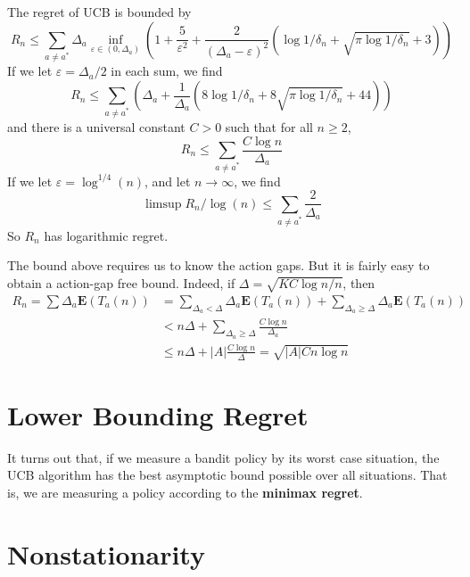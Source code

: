 \begin{theorem}
    The regret of UCB is bounded by
    \[ R_n \leq \sum_{a \neq a^*} \Delta_a \inf_{\varepsilon \in (0,\Delta_a)} \left(1 + \frac{5}{\varepsilon^2} + \frac{2}{(\Delta_a - \varepsilon)^2} \left(\log 1/\delta_n + \sqrt{\pi \log 1/\delta_n} + 3\right) \right) \]
    If we let $\varepsilon = \Delta_a/2$ in each sum, we find
    \[ R_n \leq \sum_{a \neq a^*} \left( \Delta_a + \frac{1}{\Delta_a} \left( 8 \log 1/\delta_n + 8 \sqrt{\pi \log 1 / \delta_n} + 44 \right) \right) \]
    and there is a universal constant $C > 0$ such that for all $n \geq 2$,
    \[ R_n \leq \sum_{a \neq a^*} \frac{C \log n}{\Delta_a} \]
    If we let $\varepsilon = \log^{1/4}(n)$, and let $n \to \infty$, we find
    \[ \limsup R_n/\log(n) \leq \sum_{a \neq a^*} \frac{2}{\Delta_a} \]
    So $R_n$ has logarithmic regret.
\end{theorem}

The bound above requires us to know the action gaps. But it is fairly easy to obtain a action-gap free bound. Indeed, if $\Delta = \sqrt{KC \log n / n}$, then
%
\begin{align*}
    R_n = \sum \Delta_a \mathbf{E}(T_a(n)) &= \sum_{\Delta_a < \Delta} \Delta_a \mathbf{E}(T_a(n)) + \sum_{\Delta_a \geq \Delta} \Delta_a \mathbf{E}(T_a(n))\\
    &< n \Delta + \sum_{\Delta_a \geq \Delta} \frac{C \log n}{\Delta_a}\\
    &\leq n \Delta + |A| \frac{C \log n}{\Delta} = \sqrt{|A| C n \log n}
\end{align*}

\section{Lower Bounding Regret}

It turns out that, if we measure a bandit policy by its worst case situation, the UCB algorithm has the best asymptotic bound possible over all situations. That is, we are measuring a policy according to the {\bf minimax regret}.

\section{Nonstationarity}

